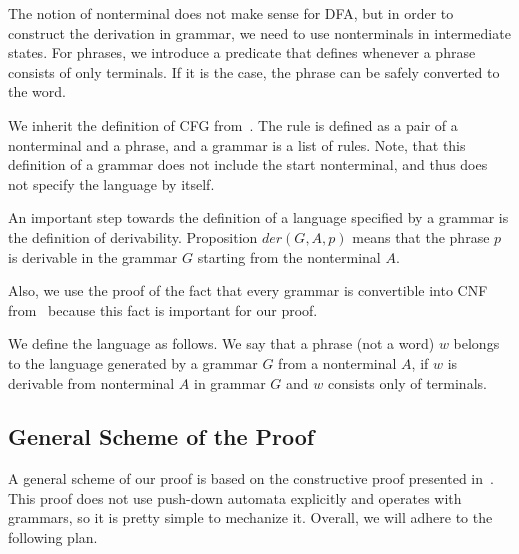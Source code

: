 \documentclass[runningheads]{llncs}
\begin{document}
The notion of nonterminal does not make sense for DFA, but in order to construct the derivation in grammar, we need to use nonterminals in intermediate states. For phrases, we introduce a predicate that defines whenever a phrase consists of only terminals. If it is the case, the phrase can be safely converted to the word.

We inherit the definition of CFG from~\cite{smolkaHofmann2016}. The rule is defined as a pair of a nonterminal and a phrase, and a grammar is a list of rules.
Note, that this definition of a grammar does not include the start nonterminal, and thus does not specify the language by itself.

An important step towards the definition of a language specified by a grammar is the definition of derivability. Proposition $der(G, A, p)$ means that the phrase $p$ is derivable in the grammar $G$ starting from the nonterminal $A$.

Also, we use the proof of the fact that every grammar is convertible into CNF from~\cite{smolkaHofmann2016} because this fact is important for our proof.

We define the language as follows. We say that a phrase (not a word) $ w $ belongs to the language generated by a grammar $G$ from a nonterminal $A$, if $ w $ is derivable from nonterminal $ A $ in grammar $ G $ and $ w $ consists only of terminals.


\subsection{General Scheme of the Proof}

A general scheme of our proof is based on the constructive proof presented in~\cite{beigelproof}.
This proof does not use push-down automata explicitly and operates with grammars, so it is pretty simple to mechanize it.
Overall, we will adhere to the following plan.
\end{document}
